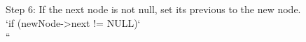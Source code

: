 \documentclass[preview]{standalone}
\begin{document}
Step 6: If the next node is not null, set its previous to the new node.\\`if (newNode->next != NULL)`\\``\\
\end{document}
